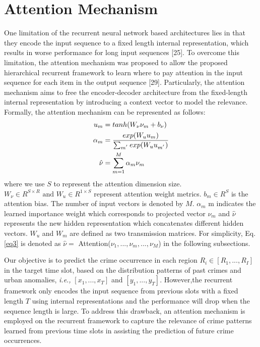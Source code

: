 \section{Attention Mechanism}

One limitation of the recurrent neural network based architectures
lies in that they encode the input sequence to a fixed length internal
representation, which results in worse performance for long input
sequences [25]. To overcome this limitation, the attention mechanism was proposed to allow the proposed hierarchical recurrent
framework to learn where to pay attention in the input sequence
for each item in the output sequence [29]. Particularly, the attention
mechanism aims to free the encoder-decoder architecture from the
fixed-length internal representation by introducing a context vector
to model the relevance. Formally, the attention mechanism can be
represented as follows:
\begin{align}
            u_m &= tanh(W_\nu\nu_m + b_\nu)\notag\\
            \alpha_m &= \frac{exp(W_uu_m)}{\sum_{m^{'}}exp(W_uu_{m^{'}})}\notag\\
            \hat{\nu} &= \sum_{m=1}^M\alpha_m\nu_m \label{eq3}
\end{align}
where we use $S$ to represent the attention dimension size. \(W_\nu \in R^{S\times R} \text{ and } W_u \in R^{1\times S}\) represent attention weight metrics. $b_m \in R^S$ is the attention bias. The number of input vectors is denoted by $M$. $\alpha_m$ m indicates the learned importance weight which corresponds to projected vector $\nu_m$ and $\hat{\nu}$ represents the new hidden representation which concatenates different hidden vectors. $W_u$ and $W_m$ are defined as two transmission matrices. For simplicity, Eq. \ref{eq3} is denoted as $\hat{\nu} = $ Attention($\nu_1,...,\nu_m,...,\nu_M$) in the following subsections. 

Our objective is to predict the crime occurrence in each region \(R_i \in [R_1,...,R_I]\) in the target time slot, based on the distribution
patterns of past crimes and urban anomalies, \emph{i.e.,} $[x_1,...,x_T]$ and $[y_1,...,y_T]$. However,the recurrent framework only encodes the input sequence from previous slots with a fixed length $T$ using internal representations and the performance will drop when the sequence length is large. To address this drawback, an attention mechanism is employed on the recurrent framework to
capture the relevance of crime patterns learned from previous time
slots in assisting the prediction of future crime occurrences.

